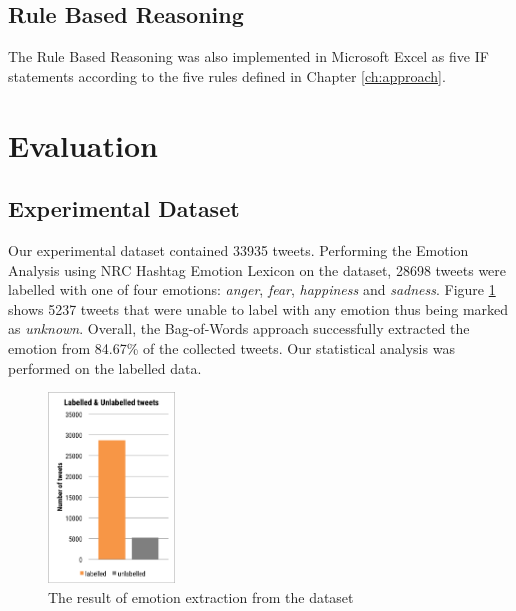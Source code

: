 \subsection{Rule Based Reasoning}
The Rule Based Reasoning was also implemented in Microsoft Excel as five IF statements according to the five rules defined in Chapter \ref{ch:approach}.

\section{Evaluation}
\label{sec:evaluation}
\subsection{Experimental Dataset}
Our experimental dataset contained 33935 tweets. Performing the Emotion Analysis using NRC Hashtag Emotion Lexicon \parencite{mohammad2014using} on the dataset, 28698 tweets were labelled with one of four emotions: \textit{anger}, \textit{fear}, \textit{happiness} and \textit{sadness}. Figure \ref{fig:emotionLabel} shows 5237 tweets that were unable to label with any emotion thus being marked as \textit{unknown}. Overall, the Bag-of-Words approach successfully extracted the emotion from 84.67\% of the collected tweets. Our statistical analysis was performed on the labelled data.

\begin{figure}[!htb]
\centering
\includegraphics[width=0.3\textwidth]{EmotionLabel}
\caption{The result of emotion extraction from the dataset}
\label{fig:emotionLabel}
\end{figure}


